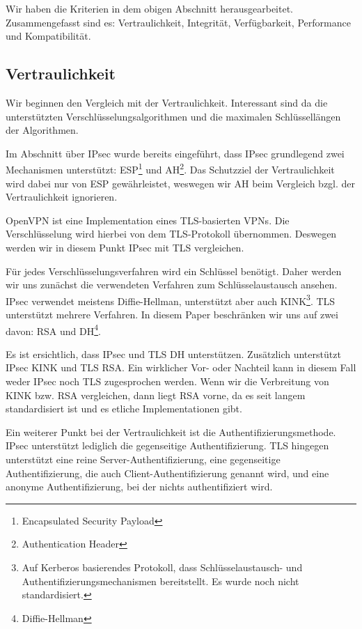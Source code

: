 \documentclass[12pt]{scrartcl}
\begin{document}
Wir haben die Kriterien in dem obigen Abschnitt herausgearbeitet. Zusammengefasst sind es: Vertraulichkeit, Integrität, Verfügbarkeit, Performance und Kompatibilität.

\subsection{Vertraulichkeit}
Wir beginnen den Vergleich mit der Vertraulichkeit. Interessant sind da die unterstützten Verschlüsselungsalgorithmen und die maximalen Schlüssellängen der Algorithmen.

Im Abschnitt über IPsec wurde bereits eingeführt, dass IPsec grundlegend zwei Mechanismen unterstützt: ESP\footnote{Encapsulated Security Payload} und AH\footnote{Authentication Header}. Das Schutzziel der Vertraulichkeit wird dabei nur von ESP gewährleistet, weswegen wir AH beim Vergleich bzgl. der Vertraulichkeit ignorieren.

OpenVPN ist eine Implementation eines TLS-basierten VPNs. Die Verschlüsselung wird hierbei von dem TLS-Protokoll übernommen. Deswegen werden wir in diesem Punkt IPsec mit TLS vergleichen.

Für jedes Verschlüsselungsverfahren wird ein Schlüssel benötigt. Daher werden wir uns zunächst die verwendeten Verfahren zum Schlüsselaustausch ansehen. IPsec verwendet meistens Diffie-Hellman, unterstützt aber auch KINK\footnote{Auf Kerberos basierendes Protokoll, dass Schlüsselaustausch- und Authentifizierungsmechanismen bereitstellt. Es wurde noch nicht standardisiert\cite{Alshamsi2005}.}. TLS unterstützt mehrere Verfahren. In diesem Paper beschränken wir uns auf zwei davon: RSA und DH\footnote{Diffie-Hellman}\cite{Alshamsi2005}. 

Es ist ersichtlich, dass IPsec und TLS DH unterstützen. Zusätzlich unterstützt IPsec KINK und TLS RSA. Ein wirklicher Vor- oder Nachteil kann in diesem Fall weder IPsec noch TLS zugesprochen werden. Wenn wir die Verbreitung von KINK bzw. RSA vergleichen, dann liegt RSA vorne, da es seit langem standardisiert ist und es etliche Implementationen gibt.

Ein weiterer Punkt bei der Vertraulichkeit ist die Authentifizierungsmethode. IPsec unterstützt lediglich die gegenseitige Authentifizierung. TLS hingegen unterstützt eine reine Server-Authentifizierung, eine gegenseitige Authentifizierung, die auch Client-Authentifizierung genannt wird, und eine anonyme Authentifizierung, bei der nichts authentifiziert wird.\cite{Alshamsi2005}
\end{document}
